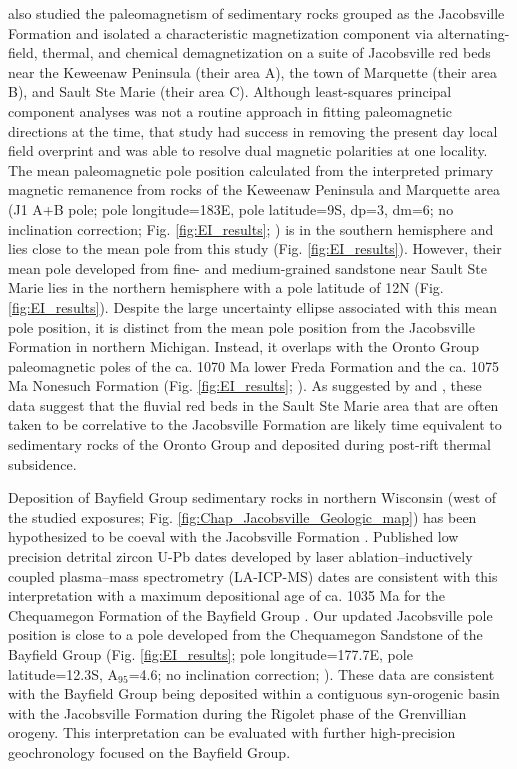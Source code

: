 \cite{Roy1978a} also studied the paleomagnetism of sedimentary rocks grouped as the Jacobsville Formation and isolated a characteristic magnetization component via alternating-field, thermal, and chemical demagnetization on a suite of Jacobsville red beds near the Keweenaw Peninsula (their area A), the town of Marquette (their area B), and Sault Ste Marie (their area C). Although least-squares principal component analyses was not a routine approach in fitting paleomagnetic directions at the time, that study had success in removing the present day local field overprint and was able to resolve dual magnetic polarities at one locality. The mean paleomagnetic pole position calculated from the interpreted primary magnetic remanence from rocks of the Keweenaw Peninsula and Marquette area (J1 A+B pole; pole longitude=183\textdegree E, pole latitude=9\textdegree S, dp=3\textdegree, dm=6\textdegree; no inclination correction; Fig. \ref{fig:EI_results}; \cite{Roy1978a}) is in the southern hemisphere and lies close to the mean pole from this study (Fig. \ref{fig:EI_results}). However, their mean pole developed from fine- and medium-grained sandstone near Sault Ste Marie lies in the northern hemisphere with a pole latitude of 12\textdegree N (Fig. \ref{fig:EI_results}). Despite the large uncertainty ellipse associated with this mean pole position, it is distinct from the mean pole position from the Jacobsville Formation in northern Michigan. Instead, it overlaps with the Oronto Group paleomagnetic poles of the ca. 1070 Ma lower Freda Formation and the ca. 1075 Ma Nonesuch Formation (Fig. \ref{fig:EI_results}; \cite{Henry1977a, Slotznick2023a}). As suggested by \cite{Dubois1962a} and \cite{Roy1978a}, these data suggest that the fluvial red beds in the Sault Ste Marie area that are often taken to be correlative to the Jacobsville Formation \cite[e.g.][]{Malone2020a} are likely time equivalent to sedimentary rocks of the Oronto Group and deposited during post-rift thermal subsidence. 

Deposition of Bayfield Group sedimentary rocks in northern Wisconsin (west of the studied exposures; Fig. \ref{fig:Chap_Jacobsville_Geologic_map}) has been hypothesized to be coeval with the Jacobsville Formation \citep{Hamblin1958a, Kalliokoski1982a, Malone2016a}. Published low precision detrital zircon U-Pb dates developed by laser ablation–inductively coupled plasma–mass spectrometry (LA-ICP-MS) dates are consistent with this interpretation with a maximum depositional age of ca. 1035 Ma for the Chequamegon Formation of the Bayfield Group \citep{Craddock2013a}. Our updated Jacobsville pole position is close to a pole developed from the Chequamegon Sandstone of the Bayfield Group (Fig. \ref{fig:EI_results}; pole longitude=177.7\textdegree E, pole latitude=12.3\textdegree S, A$_95$=4.6\textdegree; no inclination correction; \cite{McCabe1983a}). These data are consistent with the Bayfield Group being deposited within a contiguous syn-orogenic basin with the Jacobsville Formation during the Rigolet phase of the Grenvillian orogeny. This interpretation can be evaluated with further high-precision geochronology focused on the Bayfield Group. 

